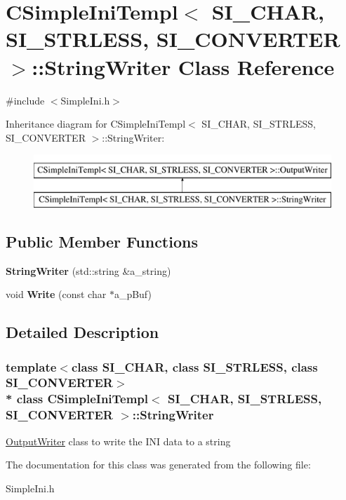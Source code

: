 \hypertarget{a00034}{}\section{C\+Simple\+Ini\+Templ$<$ S\+I\+\_\+\+C\+H\+AR, S\+I\+\_\+\+S\+T\+R\+L\+E\+SS, S\+I\+\_\+\+C\+O\+N\+V\+E\+R\+T\+ER $>$\+:\+:String\+Writer Class Reference}
\label{a00034}


{\ttfamily \#include $<$Simple\+Ini.\+h$>$}

Inheritance diagram for C\+Simple\+Ini\+Templ$<$ S\+I\+\_\+\+C\+H\+AR, S\+I\+\_\+\+S\+T\+R\+L\+E\+SS, S\+I\+\_\+\+C\+O\+N\+V\+E\+R\+T\+ER $>$\+:\+:String\+Writer\+:\begin{figure}[H]
\begin{center}
\leavevmode
\includegraphics[height=2.000000cm]{a00034}
\end{center}
\end{figure}
\subsection*{Public Member Functions}
\begin{DoxyCompactItemize}
\item 
{\bfseries String\+Writer} (std\+::string \&a\+\_\+string)\hypertarget{a00034_ad50338a07a9b6de7e4a78d0bbc11f67b}{}\label{a00034_ad50338a07a9b6de7e4a78d0bbc11f67b}

\item 
void {\bfseries Write} (const char $\ast$a\+\_\+p\+Buf)\hypertarget{a00034_afdfd0dfe71278ea7490a9d4ef6bffadc}{}\label{a00034_afdfd0dfe71278ea7490a9d4ef6bffadc}

\end{DoxyCompactItemize}


\subsection{Detailed Description}
\subsubsection*{template$<$class S\+I\+\_\+\+C\+H\+AR, class S\+I\+\_\+\+S\+T\+R\+L\+E\+SS, class S\+I\+\_\+\+C\+O\+N\+V\+E\+R\+T\+ER$>$\\*
class C\+Simple\+Ini\+Templ$<$ S\+I\+\_\+\+C\+H\+A\+R, S\+I\+\_\+\+S\+T\+R\+L\+E\+S\+S, S\+I\+\_\+\+C\+O\+N\+V\+E\+R\+T\+E\+R $>$\+::\+String\+Writer}

\hyperlink{a00020}{Output\+Writer} class to write the I\+NI data to a string 

The documentation for this class was generated from the following file\+:\begin{DoxyCompactItemize}
\item 
Simple\+Ini.\+h\end{DoxyCompactItemize}
